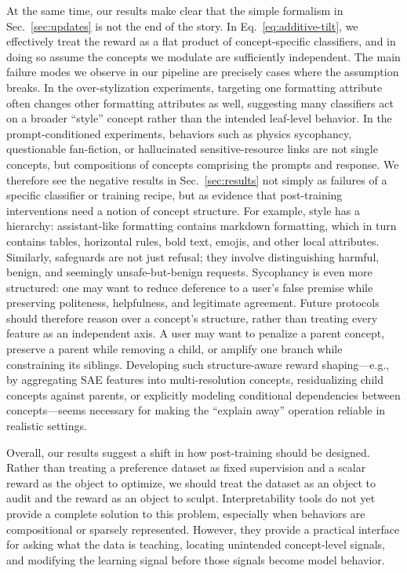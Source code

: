 \documentclass{article} %
\begin{document}
At the same time, our results make clear that the simple formalism in Sec.~\ref{sec:updates} is not the end of the story. In Eq.~\ref{eq:additive-tilt}, we effectively treat the reward as a flat product of concept-specific classifiers, and in doing so assume the concepts we modulate are sufficiently independent. The main failure modes we observe in our pipeline are precisely cases where the assumption breaks. In the over-stylization experiments, targeting one formatting attribute often changes other formatting attributes as well, suggesting many classifiers act on a broader ``style'' concept rather than the intended leaf-level behavior. In the prompt-conditioned experiments, behaviors such as physics sycophancy, questionable fan-fiction, or hallucinated sensitive-resource links are not single concepts, but compositions of concepts comprising the prompts and response. 
% 
We therefore see the negative results in Sec.~\ref{sec:results} not simply as failures of a specific classifier or training recipe, but as evidence that post-training interventions need a notion of concept structure. For example, style has a hierarchy: assistant-like formatting contains markdown formatting, which in turn contains tables, horizontal rules, bold text, emojis, and other local attributes. Similarly, safeguards are not just refusal; they involve distinguishing harmful, benign, and seemingly unsafe-but-benign requests. Sycophancy is even more structured: one may want to reduce deference to a user’s false premise while preserving politeness, helpfulness, and legitimate agreement. Future protocols should therefore reason over a concept's structure, rather than treating every feature as an independent axis. A user may want to penalize a parent concept, preserve a parent while removing a child, or amplify one branch while constraining its siblings. Developing such structure-aware reward shaping---e.g., by aggregating SAE features into multi-resolution concepts, residualizing child concepts against parents, or explicitly modeling conditional dependencies between concepts---seems necessary for making the ``explain away'' operation reliable in realistic settings.


Overall, our results suggest a shift in how post-training should be designed. Rather than treating a preference dataset as fixed supervision and a scalar reward as the object to optimize, we should treat the dataset as an object to audit and the reward as an object to sculpt. Interpretability tools do not yet provide a complete solution to this problem, especially when behaviors are compositional or sparsely represented. However, they provide a practical interface for asking what the data is teaching, locating unintended concept-level signals, and modifying the learning signal before those signals become model behavior.
\end{document}
